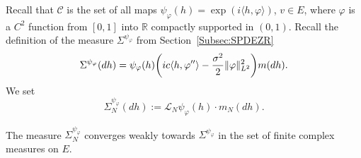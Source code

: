 \documentclass[AHL,Unicode,longabstracts]{cedram}
\theoremstyle{plain}
\newcommand{\cC}{\mathcal{C}}
\newcommand{\cL}{\mathcal{L}}
\newcommand{\R}{\mathbb{R}}
\let\originalleft\left
\let\originalright\right
\renewcommand{\left}{\mathopen{}\mathclose\bgroup\originalleft}
\renewcommand{\right}{\aftergroup\egroup\originalright}
\begin{document}
Recall that $\cC$ is the set of all maps $\psi_\varphi(h) = \exp(i \langle h,\varphi \rangle)$, $v\in E$, where $\varphi$ is a $C^2$ function from $[0,1]$ into $\R$ compactly supported in $(0,1)$. Recall the definition of the measure $\Sigma^{\psi_\varphi}$ from Section~\ref{Subsec:SPDEZR}
\begin{equation*}
\Sigma^{\psi_\varphi}(dh) = \psi_\varphi(h)\left(ic \langle h,\varphi''\rangle -\frac{\sigma^2}{2} \| \varphi\|_{L^2}^2 \right) m(dh).
\end{equation*}
We set
\[
\Sigma_N^{\psi_\varphi}(dh) := \cL_N \psi_\varphi(h)\cdot m_N(dh).
\]

\begin{prop}\label{Prop:DiscreteIbPF}
The measure $\Sigma_N^{\psi_\varphi}$ converges weakly towards $\Sigma^{\psi_\varphi}$ in the set of finite complex measures on $E$.
\end{prop}
\end{document}
